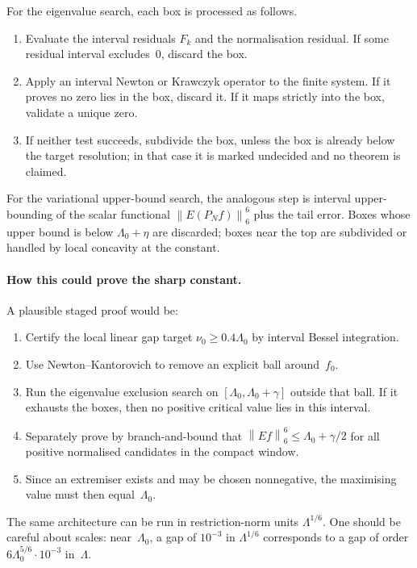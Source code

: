 \documentclass[12pt]{article}
\theoremstyle{definition}
\theoremstyle{remark}
\newcommand{\norm}[1]{\left\|#1\right\|}
\begin{document}
For the eigenvalue search, each box is processed as follows.
\begin{enumerate}[leftmargin=2em]
  \item Evaluate the interval residuals $F_k$ and the normalisation
    residual.  If some residual interval excludes~$0$, discard the box.
  \item Apply an interval Newton or Krawczyk operator to the finite system.
    If it proves no zero lies in the box, discard it.  If it maps strictly
    into the box, validate a unique zero.
  \item If neither test succeeds, subdivide the box, unless the box is
    already below the target resolution; in that case it is marked
    undecided and no theorem is claimed.
\end{enumerate}
For the variational upper-bound search, the analogous step is interval
upper-bounding of the scalar functional $\norm{E(P_Nf)}_6^6$ plus the
tail error.  Boxes whose upper bound is below $\Lambda_0+\eta$ are
discarded; boxes near the top are subdivided or handled by local concavity
at the constant.

\paragraph{How this could prove the sharp constant.}
A plausible staged proof would be:
\begin{enumerate}[leftmargin=2em]
  \item Certify the local linear gap target
    $\nu_0\geq0.4\Lambda_0$ by interval Bessel integration.
  \item Use Newton--Kantorovich to remove an explicit ball around~$f_0$.
  \item Run the eigenvalue exclusion search on
    $[\Lambda_0,\Lambda_0+\gamma]$ outside that ball.  If it exhausts the
    boxes, then no positive critical value lies in this interval.
  \item Separately prove by branch-and-bound that
    $\norm{Ef}_6^6\leq\Lambda_0+\gamma/2$ for all positive normalised
    candidates in the compact window.
  \item Since an extremiser exists and may be chosen nonnegative, the
    maximising value must then equal~$\Lambda_0$.
\end{enumerate}
The same architecture can be run in restriction-norm units
$\Lambda^{1/6}$.  One should be careful about scales: near~$\Lambda_0$,
a gap of $10^{-3}$ in $\Lambda^{1/6}$ corresponds to a gap of order
$6\Lambda_0^{5/6}\cdot10^{-3}$ in~$\Lambda$.
\end{document}
